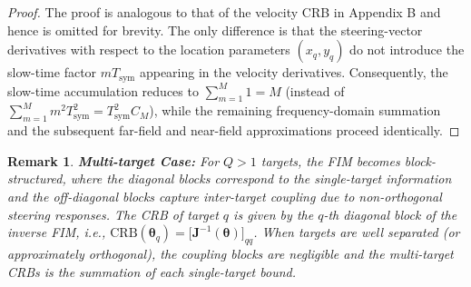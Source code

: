 \documentclass[9pt,final,journal,twocolumn]{IEEEtran}
\newtheorem{remark}{Remark}
\begin{document}
\begin{proof}
The proof is analogous to that of the velocity CRB in Appendix B and hence is omitted for brevity.
The only difference is that the steering-vector derivatives with respect to the location parameters $(x_q,y_q)$ do not introduce the slow-time factor $mT_{\mathrm{sym}}$ appearing in the velocity derivatives.
Consequently, the slow-time accumulation reduces to
$\sum_{m=1}^{M}1=M$ (instead of $\sum_{m=1}^{M}m^{2}T_{\mathrm{sym}}^{2}=T_{\mathrm{sym}}^{2}C_M$),
while the remaining frequency-domain summation and the subsequent far-field and near-field approximations proceed identically.
\end{proof}

\begin{remark}\textbf{Multi-target Case:}
For $Q>1$ targets, the FIM becomes block-structured, where the diagonal blocks correspond to the single-target information and the off-diagonal blocks capture inter-target coupling due to non-orthogonal steering responses. The CRB of target $q$ is given by the $q$-th diagonal block of the inverse FIM, i.e., $\mathrm{CRB}(\boldsymbol{\theta}_q)=\big[\mathbf{J}^{-1}(\boldsymbol{\theta})\big]_{qq}$. When targets are well separated (or approximately orthogonal), the coupling blocks are negligible and the multi-target CRBs is the summation of each single-target bound. %
\end{remark}



\end{document}
